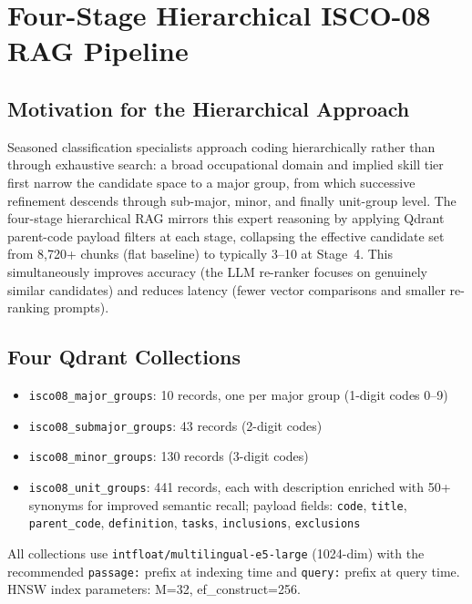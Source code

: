 \section{Four-Stage Hierarchical ISCO-08 RAG Pipeline}
\label{sec:arch-rag}

\subsection{Motivation for the Hierarchical Approach}

Seasoned classification specialists approach coding hierarchically rather than
through exhaustive search: a broad occupational domain and implied skill tier
first narrow the candidate space to a major group, from which successive
refinement descends through sub-major, minor, and finally unit-group level.
The four-stage hierarchical RAG mirrors this expert reasoning by applying
Qdrant parent-code payload filters at each stage, collapsing the effective
candidate set from 8,720+ chunks (flat baseline) to typically 3--10 at Stage~4.
This simultaneously improves accuracy (the LLM re-ranker focuses on genuinely
similar candidates) and reduces latency (fewer vector comparisons and smaller
re-ranking prompts).

\subsection{Four Qdrant Collections}

\begin{itemize}
  \item \texttt{isco08\_major\_groups}: 10 records, one per major group
  (1-digit codes 0--9)
  \item \texttt{isco08\_submajor\_groups}: 43 records (2-digit codes)
  \item \texttt{isco08\_minor\_groups}: 130 records (3-digit codes)
  \item \texttt{isco08\_unit\_groups}: 441 records, each with description
  enriched with 50+ synonyms for improved semantic recall; payload fields:
  \texttt{code}, \texttt{title}, \texttt{parent\_code}, \texttt{definition},
  \texttt{tasks}, \texttt{inclusions}, \texttt{exclusions}
\end{itemize}

All collections use \texttt{intfloat/\-multilingual-e5-large} (1024-dim) with the
recommended \texttt{passage:} prefix at indexing time and \texttt{query:} prefix
at query time.
HNSW index parameters: M=32, ef\_construct=256.

